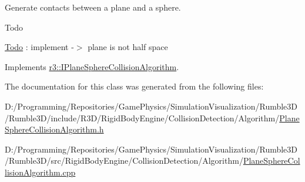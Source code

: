 Generate contacts between a plane and a sphere. 

\begin{DoxyRefDesc}{Todo}
\item[\mbox{\hyperlink{todo__todo000005}{Todo}}]\+: implement -\/$>$ plane is not half space \end{DoxyRefDesc}


Implements \mbox{\hyperlink{classr3_1_1_i_plane_sphere_collision_algorithm_a92ddfd3ba00ed53b183a6aef41b04a60}{r3\+::\+I\+Plane\+Sphere\+Collision\+Algorithm}}.



The documentation for this class was generated from the following files\+:\begin{DoxyCompactItemize}
\item 
D\+:/\+Programming/\+Repositories/\+Game\+Physics/\+Simulation\+Visualization/\+Rumble3\+D/\+Rumble3\+D/include/\+R3\+D/\+Rigid\+Body\+Engine/\+Collision\+Detection/\+Algorithm/\mbox{\hyperlink{_plane_sphere_collision_algorithm_8h}{Plane\+Sphere\+Collision\+Algorithm.\+h}}\item 
D\+:/\+Programming/\+Repositories/\+Game\+Physics/\+Simulation\+Visualization/\+Rumble3\+D/\+Rumble3\+D/src/\+Rigid\+Body\+Engine/\+Collision\+Detection/\+Algorithm/\mbox{\hyperlink{_plane_sphere_collision_algorithm_8cpp}{Plane\+Sphere\+Collision\+Algorithm.\+cpp}}\end{DoxyCompactItemize}
